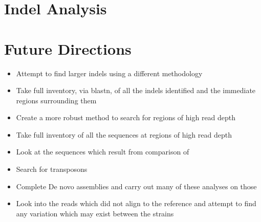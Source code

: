 \documentclass[12pt]{article}
\begin{document}
\section{Indel Analysis}


%
%
\section{Future Directions}
\begin{itemize}
\item Attempt to find larger indels using a different methodology
\vspace{-0.5cm}
\item Take full inventory, via blastn, of all the indels identified and the immediate regions surrounding them 
\vspace{-0.5cm}
\item Create a more robust method to search for regions of high read depth
\vspace{-0.5cm}
\item Take full inventory of all the sequences at regions of high read depth
\vspace{-0.5cm}
\item Look at the sequences which result from comparison of 
\vspace{-0.5cm}
\item Search for transposons
\vspace{-0.5cm}
\item Complete De novo assemblies and carry out many of these analyses on those
\vspace{-0.5cm}
\item Look into the reads which did not align to the reference and attempt to find any variation which may exist between the strains
\end{itemize}
\end{document}
